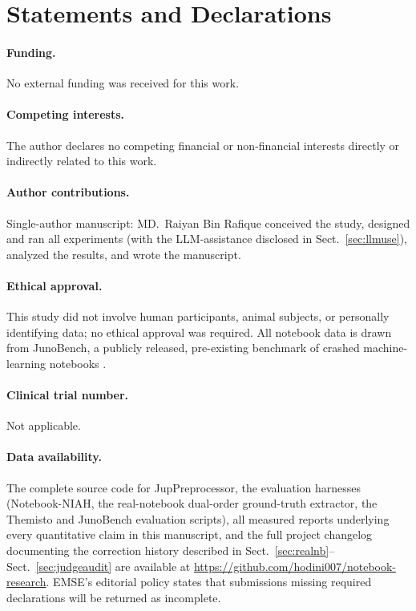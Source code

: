 \documentclass[11pt]{article}
\begin{document}
\section*{Statements and Declarations}

\paragraph{Funding.} No external funding was received for this work.

\paragraph{Competing interests.} The author declares no competing financial
or non-financial interests directly or indirectly related to this work.

\paragraph{Author contributions.} Single-author manuscript: MD.\ Raiyan Bin
Rafique conceived the study, designed and ran all experiments (with the
LLM-assistance disclosed in Sect.~\ref{sec:llmuse}), analyzed the results, and
wrote the manuscript.

\paragraph{Ethical approval.} This study did not involve human participants,
animal subjects, or personally identifying data; no ethical approval was
required. All notebook data is drawn from JunoBench, a publicly released,
pre-existing benchmark of crashed machine-learning notebooks
\citep{wang2025junobench}.

\paragraph{Clinical trial number.} Not applicable.

\paragraph{Data availability.} The complete source code for
JupPreprocessor, the evaluation harnesses (Notebook-NIAH, the real-notebook
dual-order ground-truth extractor, the Themisto and JunoBench evaluation
scripts), all measured reports underlying every quantitative claim in this
manuscript, and the full project changelog documenting the correction
history described in Sect.~\ref{sec:realnb}--Sect.~\ref{sec:judgeaudit} are
available at
\url{https://github.com/hodini007/notebook-research}.
EMSE's editorial policy states that submissions missing required
declarations will be returned as incomplete.
\end{document}
